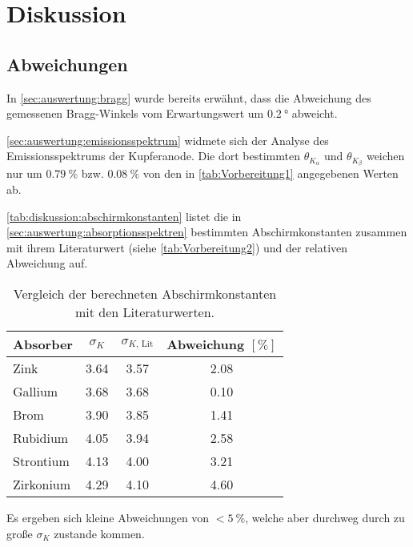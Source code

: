 \section{Diskussion}

\subsection{Abweichungen}

In \autoref{sec:auswertung:bragg} wurde bereits erwähnt,
dass die Abweichung des gemessenen Bragg-Winkels vom Erwartungswert
um $\SI{0.2}{\degree}$ abweicht.


\autoref{sec:auswertung:emissionsspektrum} widmete sich der Analyse des Emissionsspektrums der Kupferanode.
Die dort bestimmten $\theta_{K_\alpha}$ und $\theta_{K_\beta}$ weichen nur um
$\SI{0.79}{\percent}$ bzw. $\SI{0.08}{\percent}$ von den in \autoref{tab:Vorbereitung1} angegebenen Werten ab.


\autoref{tab:diskussion:abschirmkonstanten} listet die in \autoref{sec:auswertung:absorptionsspektren} bestimmten Abschirmkonstanten
zusammen mit ihrem Literaturwert (siehe \autoref{tab:Vorbereitung2}) und der relativen Abweichung auf.

\begin{table}
    \centering
    \caption{Vergleich der berechneten Abschirmkonstanten mit den Literaturwerten.}
    \label{tab:diskussion:abschirmkonstanten}
    \begin{tabular}{l S[table-format=1.2] S[table-format=1.2] S[table-format=1.2]}
    \toprule
    Absorber &
    {$\sigma_K$} &
    {$\sigma_{K\text{, Lit}}$} &
    {Abweichung $[\si{\percent}]$} \\
    \midrule
    Zink      & 3.64 & 3.57 & 2.08 \\
    Gallium   & 3.68 & 3.68 & 0.10 \\
    Brom      & 3.90 & 3.85 & 1.41 \\
    Rubidium  & 4.05 & 3.94 & 2.58 \\
    Strontium & 4.13 & 4.00 & 3.21 \\
    Zirkonium & 4.29 & 4.10 & 4.60 \\
    \bottomrule
    \end{tabular}
\end{table}

Es ergeben sich kleine Abweichungen von $< \SI{5}{\percent}$,
welche aber durchweg durch zu große $\sigma_K$ zustande kommen.


